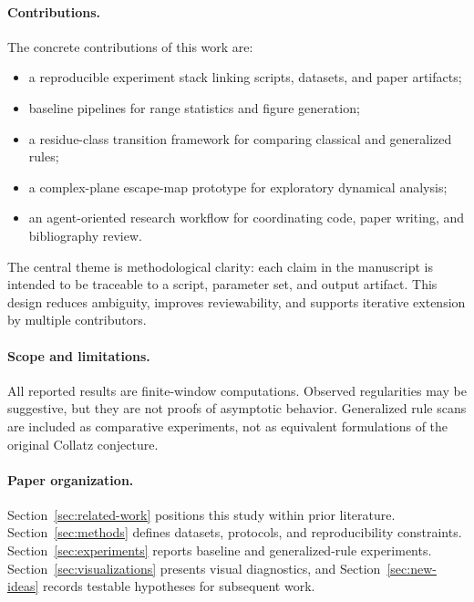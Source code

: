 \paragraph{Contributions.}
The concrete contributions of this work are:
\begin{itemize}
  \item a reproducible experiment stack linking scripts, datasets, and paper artifacts;
  \item baseline pipelines for range statistics and figure generation;
  \item a residue-class transition framework for comparing classical and generalized rules;
  \item a complex-plane escape-map prototype for exploratory dynamical analysis;
  \item an agent-oriented research workflow for coordinating code, paper writing, and bibliography review.
\end{itemize}

The central theme is methodological clarity: each claim in the manuscript is intended to be traceable to a script, parameter set, and output artifact.
This design reduces ambiguity, improves reviewability, and supports iterative extension by multiple contributors.

\paragraph{Scope and limitations.}
All reported results are finite-window computations.
Observed regularities may be suggestive, but they are not proofs of asymptotic behavior.
Generalized rule scans are included as comparative experiments, not as equivalent formulations of the original Collatz conjecture.

\paragraph{Paper organization.}
Section~\ref{sec:related-work} positions this study within prior literature.
Section~\ref{sec:methods} defines datasets, protocols, and reproducibility constraints.
Section~\ref{sec:experiments} reports baseline and generalized-rule experiments.
Section~\ref{sec:visualizations} presents visual diagnostics, and Section~\ref{sec:new-ideas} records testable hypotheses for subsequent work.
